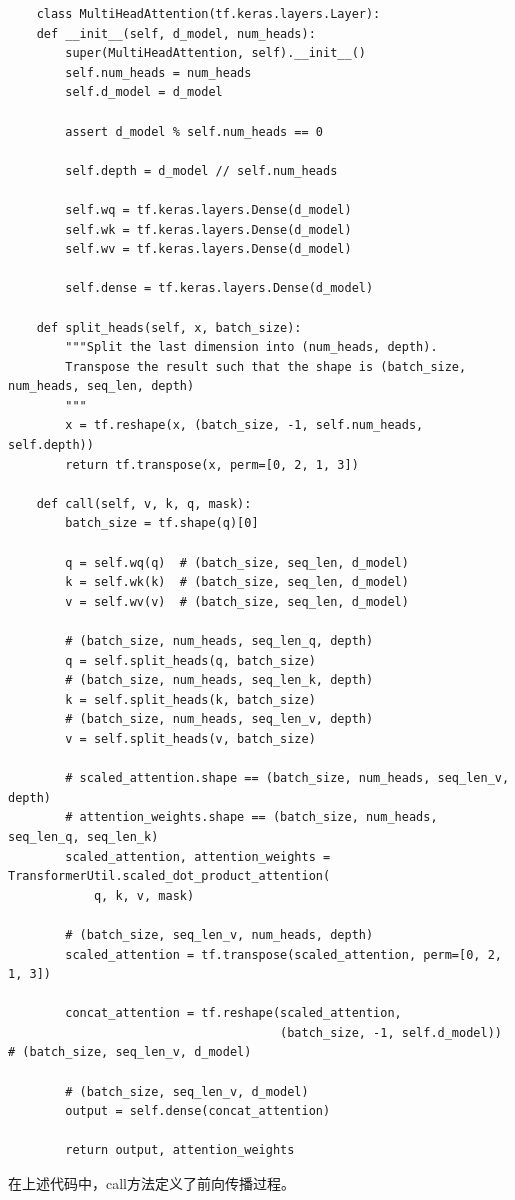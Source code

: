 \documentclass{article}
\begin{document}
\begin{lstlisting}
    class MultiHeadAttention(tf.keras.layers.Layer):
    def __init__(self, d_model, num_heads):
        super(MultiHeadAttention, self).__init__()
        self.num_heads = num_heads
        self.d_model = d_model

        assert d_model % self.num_heads == 0

        self.depth = d_model // self.num_heads

        self.wq = tf.keras.layers.Dense(d_model)
        self.wk = tf.keras.layers.Dense(d_model)
        self.wv = tf.keras.layers.Dense(d_model)

        self.dense = tf.keras.layers.Dense(d_model)

    def split_heads(self, x, batch_size):
        """Split the last dimension into (num_heads, depth).
        Transpose the result such that the shape is (batch_size, num_heads, seq_len, depth)
        """
        x = tf.reshape(x, (batch_size, -1, self.num_heads, self.depth))
        return tf.transpose(x, perm=[0, 2, 1, 3])

    def call(self, v, k, q, mask):
        batch_size = tf.shape(q)[0]

        q = self.wq(q)  # (batch_size, seq_len, d_model)
        k = self.wk(k)  # (batch_size, seq_len, d_model)
        v = self.wv(v)  # (batch_size, seq_len, d_model)

        # (batch_size, num_heads, seq_len_q, depth)
        q = self.split_heads(q, batch_size)
        # (batch_size, num_heads, seq_len_k, depth)
        k = self.split_heads(k, batch_size)
        # (batch_size, num_heads, seq_len_v, depth)
        v = self.split_heads(v, batch_size)

        # scaled_attention.shape == (batch_size, num_heads, seq_len_v, depth)
        # attention_weights.shape == (batch_size, num_heads, seq_len_q, seq_len_k)
        scaled_attention, attention_weights = TransformerUtil.scaled_dot_product_attention(
            q, k, v, mask)

        # (batch_size, seq_len_v, num_heads, depth)
        scaled_attention = tf.transpose(scaled_attention, perm=[0, 2, 1, 3])

        concat_attention = tf.reshape(scaled_attention,
                                      (batch_size, -1, self.d_model))  # (batch_size, seq_len_v, d_model)

        # (batch_size, seq_len_v, d_model)
        output = self.dense(concat_attention)

        return output, attention_weights
\end{lstlisting}
在上述代码中，call方法定义了前向传播过程。
    
\end{document}
